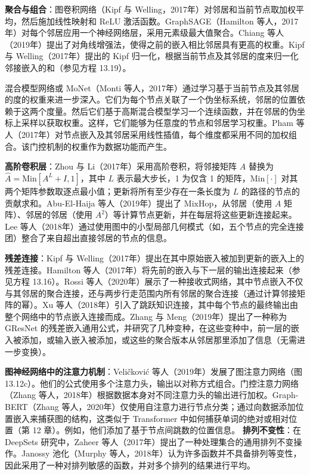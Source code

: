 \documentclass[lang=cn,newtx,10pt,scheme=chinese]{elegantbook}
\begin{document}
\textbf{聚合与组合}：图卷积网络（Kipf 与 Welling，2017年）对邻居和当前节点取加权平均，然后施加线性映射和 ReLU 激活函数。GraphSAGE（Hamilton 等人，2017年）对每个邻居应用一个神经网络层，采用元素级最大值聚合。Chiang 等人（2019年）提出了对角线增强法，使得之前的嵌入相比邻居具有更高的权重。Kipf 与 Welling（2017年）提出的 Kipf 归一化，根据当前节点及其邻居的度来归一化邻接嵌入的和（参见方程 13.19）。

混合模型网络或 MoNet（Monti 等人，2017年）通过学习基于当前节点及其邻居的度的权重来进一步深入。它们为每个节点关联了一个伪坐标系统，邻居的位置依赖于这两个度量。然后它们基于高斯混合模型学习一个连续函数，并在邻居的伪坐标上采样以获取权重。这样，它们能够为任意度的节点和邻居学习权重。Pham 等人（2017年）对节点嵌入及其邻居采用线性插值，每个维度都采用不同的加权组合。该门控机制的权重作为数据功能而产生。

\textbf{高阶卷积层}：Zhou 与 Li（2017年）采用高阶卷积，将邻接矩阵 \(A\) 替换为 \(\hat{A} = \text{Min}[A^L + I, 1]\)，其中 \(L\) 表示最大步长，1 为仅含 1 的矩阵，\(\text{Min}[\cdot]\) 对其两个矩阵参数取逐点最小值；更新将所有至少存在一条长度为 \(L\) 的路径的节点的贡献求和。Abu-El-Haija 等人（2019年）提出了 \(\text{MixHop}\)，从邻居（使用 \(A\) 矩阵）、邻居的邻居（使用 \(A^2\)）等计算节点更新，并在每层将这些更新连接起来。Lee 等人（2018年）通过使用图中的小型局部几何模式（如，五个节点的完全连接团）整合了来自超出直接邻居的节点的信息。

\textbf{残差连接}：Kipf 与 Welling（2017年）提出在其中原始嵌入被加到更新的嵌入上的残差连接。Hamilton 等人（2017年）将先前的嵌入与下一层的输出连接起来（参见方程 13.16）。Rossi 等人（2020年）展示了一种接收式网络，其中节点嵌入不仅与其邻居的聚合连接，还与两步行走范围内所有邻居的聚合连接（通过计算邻接矩阵的幂）。Xu 等人（2018年）引入了跳跃知识连接，其中每个节点的最终输出由整个网络中的节点嵌入连接而成。Zhang 与 Meng（2019年）提出了一种称为 GResNet 的残差嵌入通用公式，并研究了几种变种，在这些变种中，前一层的嵌入被添加，或输入嵌入被添加，或这些的聚合版本从邻居那里添加了信息（无需进一步变换）。

\textbf{图神经网络中的注意力机制}：Veličković 等人（2019年）发展了图注意力网络（图 13.12c）。他们的公式使用多个注意力头，输出以对称方式组合。门控注意力网络（Zhang 等人，2018年）根据数据本身对不同注意力头的输出进行加权。Graph-BERT（Zhang 等人，2020年）仅使用自注意力进行节点分类；通过向数据添加位置嵌入来捕获图的结构，这类似于 Transformer 中如何捕获单词的绝对或相对位置（第 12 章）。例如，他们添加了基于节点间跳数的位置信息。
\textbf{排列不变性}：在 DeepSets 研究中，Zaheer 等人（2017年）提出了一种处理集合的通用排列不变操作。Janossy 池化（Murphy 等人，2018年）认为许多函数并不具备排列等变性，因此采用了一种对排列敏感的函数，并对多个排列的结果进行平均。
\end{document}
